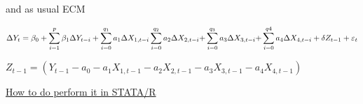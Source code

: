 \documentclass[
  ignorenonframetext,
  aspectratio=169]{beamer}
\begin{document}
\begin{frame}
and as usual ECM

\[\Delta {{Y}_{t}}={{\beta}_{0}}+\sum\limits_{i=1}^{p}{{{\beta }_{1}}\Delta{{Y}_{t-i}}+\sum\limits_{i=0}^{{{q}_{1}}}{{{a}_{1}}\Delta{{X}_{1,t-i}}\sum\limits_{i=0}^{{{q}_{2}}}{{{a}_{2}}\Delta{{X}_{2,t-i}}+}}}\sum\limits_{i=0}^{{{q}_{3}}}{{{a}_{3}}\Delta{{X}_{3,t-i}}+}\sum\limits_{i=0}^{q4}{{{a}_{4}}\Delta{{X}_{4,t-i}}}\\+\delta {{Z}_{t-1}}+{{\varepsilon}_{t}}\]

\({{Z}_{t-1}}=\left({{Y}_{t-1}}-{{a}_{0}}-{{a}_{1}}{{X}_{1,t-1}}-{{a}_{2}}{{X}_{2,t-1}}-{{a}_{3}}{{X}_{3,t-1}}-{{a}_{4}}{{X}_{4,t-1}}\right)\)

\href{http://rizaudinsahlan.blogspot.com/2016/06/ardl-cointegration-test-with-stata.html}{How
to do perform it in STATA/R}
\end{frame}
\end{document}
